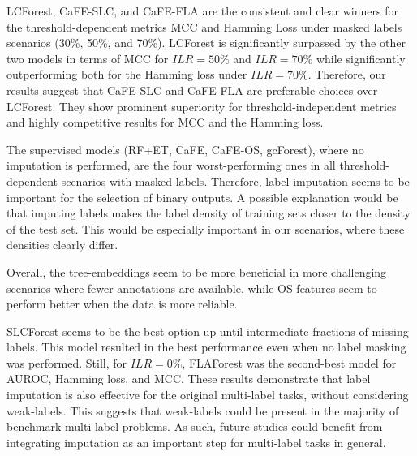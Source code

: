 \documentclass[conference,compsoc]{IEEEtran}
\begin{document}
%


LCForest, CaFE-SLC, and CaFE-FLA are the consistent and clear winners for the threshold-dependent metrics MCC and Hamming Loss under masked labels scenarios (30\%, 50\%, and 70\%).
LCForest is significantly surpassed by the other two models in terms of MCC for $ILR=50\%$ and $ILR=70\%$ while significantly outperforming both for the Hamming loss under $ILR=70\%$.
Therefore, our results suggest that CaFE-SLC and CaFE-FLA are preferable choices over LCForest. They show prominent superiority for threshold-independent metrics and highly competitive results for MCC and the Hamming loss.
%

The supervised models (RF+ET, CaFE, CaFE-OS, gcForest), where no imputation is performed, are the four worst-performing ones in all threshold-dependent scenarios with masked labels. Therefore, label imputation seems to be important for the selection of binary outputs. A possible explanation would be that imputing labels makes the label density of training sets closer to the density of the test set. This would be especially important in our scenarios, where these densities clearly differ.

Overall, the tree-embeddings seem to be more beneficial in more challenging scenarios where fewer annotations are available, while OS features seem to perform better when the data is more reliable.

SLCForest seems to be the best option up until intermediate fractions of missing labels.
This model resulted in the best performance even when no label masking was performed.
Still, for $ILR=0\%$, FLAForest was the second-best model for AUROC, Hamming loss, and MCC.
These results demonstrate that label imputation is also effective for the original multi-label tasks, without considering weak-labels. This suggests
that weak-labels could be present in the majority of benchmark multi-label problems.
As such, future studies could benefit from integrating imputation as an important step for multi-label tasks in general.
\end{document}
